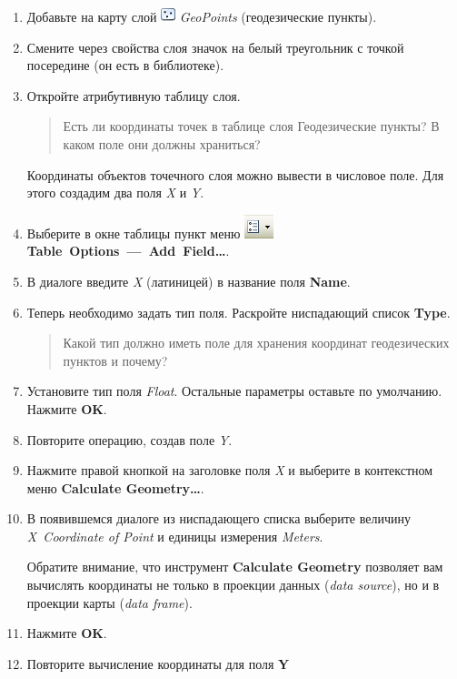 \documentclass[12pt,]{book}
\begin{document}
\begin{enumerate}
\def\labelenumi{\arabic{enumi}.}
\item
  Добавьте на карту слой
  \includegraphics{images/Ex01/image7.png} \emph{GeoPoints} (геодезические пункты).
\item
  Смените через свойства слоя значок на белый треугольник с точкой посередине (он есть в библиотеке).
\item
  Откройте атрибутивную таблицу слоя.

  \begin{quote}
  Есть ли координаты точек в таблице слоя Геодезические пункты? В каком поле они должны храниться?
  \end{quote}

  Координаты объектов точечного слоя можно вывести в числовое поле. Для этого создадим два поля \emph{X} и \emph{Y}.
\item
  Выберите в окне таблицы пункт меню \includegraphics{images/Ex01/image24.png} \textbf{Table~Options~---~Add~Field\ldots{}}.
\item
  В диалоге введите \emph{X} (латиницей) в название поля \textbf{Name}.
\item
  Теперь необходимо задать тип поля. Раскройте ниспадающий список \textbf{Type}.

  \begin{quote}
  Какой тип должно иметь поле для хранения координат геодезических пунктов и почему?
  \end{quote}
\item
  Установите тип поля \emph{Float}. Остальные параметры оставьте по умолчанию. Нажмите \textbf{OK}.
\item
  Повторите операцию, создав поле \emph{Y}.
\item
  Нажмите правой кнопкой на заголовке поля \emph{X} и выберите в контекстном меню \textbf{Calculate Geometry\ldots{}}.
\item
  В появившемся диалоге из ниспадающего списка выберите величину \emph{X~Coordinate of Point} и единицы измерения \emph{Meters}.

  Обратите внимание, что инструмент \textbf{Calculate Geometry} позволяет вам вычислять координаты не только в проекции данных (\emph{data source}), но и в проекции карты (\emph{data frame}).
\item
  Нажмите \textbf{OK}.
\item
  Повторите вычисление координаты для поля \textbf{Y}


\end{enumerate}
\end{document}
